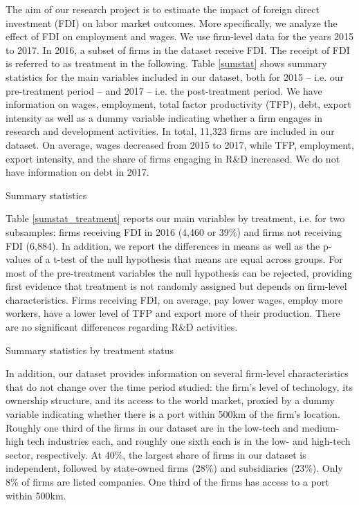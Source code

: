 The aim of our research project is to estimate the impact of foreign direct investment (FDI) on labor market outcomes. More specifically, we analyze the effect of FDI on employment and wages. We use firm-level data for the years 2015 to 2017. In 2016, a subset of firms in the dataset receive FDI. The receipt of FDI is referred to as treatment in the following. Table \ref{sumstat} shows summary statistics for the main variables included in our dataset, both for 2015 -- i.e. our pre-treatment period -- and 2017 -- i.e. the post-treatment  period. We have information on wages, employment, total factor productivity (TFP), debt, export intensity as well as a dummy variable indicating whether a firm engages in research and development activities. In total, 11,323 firms are included in our dataset. On average, wages decreased from 2015 to 2017, while TFP, employment, export intensity, and the share of firms engaging in R\&D  increased. We do not have information on debt in 2017. \\ \par 


\begin{table}[htbp]\centering \caption{Summary statistics\label{sumstat}}

 \end{table}


Table \ref{sumstat_treatment} reports our main variables by treatment, i.e. for two subsamples: firms receiving FDI in 2016 (4,460 or 39\%)  and firms not receiving FDI (6,884). In addition, we report the differences in means as well as the p-values of a t-test of the null hypothesis that means are equal across groups. For most of the pre-treatment variables the null hypothesis can be rejected, providing first evidence that treatment is not randomly assigned but depends on firm-level characteristics. Firms receiving FDI, on average, pay lower wages, employ more workers, have a lower level of TFP and export more of their production. There are no significant differences regarding R\&D activities.  \\ \par 

\begin{table}[htbp]\centering \caption{Summary statistics by treatment status\label{sumstat_treatment}}

\end{table} 


In addition, our dataset provides information on several firm-level characteristics that do not change over the time period studied: the firm's level of technology, its ownership structure, and its access to the world market, proxied by a dummy variable indicating whether there is a port within 500km of the firm's location. Roughly one third of the firms in our dataset are in the low-tech and medium-high tech industries each, and roughly one sixth each is in the low- and high-tech sector, respectively. At 40\%, the largest share of firms in our dataset is independent, followed by state-owned firms (28\%) and subsidiaries (23\%). Only 8\% of firms are listed companies. One third of the firms has access to a port within 500km. \\ \par

